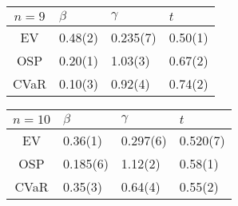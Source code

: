 \begin{tabular}{c||l|l|l}
    $n=9$          & $\beta$ & $\gamma$ & $t$     \\\hline\hline
    EV & 0.48(2) & 0.235(7) & 0.50(1) \\\hline
    OSP & 0.20(1) & 1.03(3) & 0.67(2) \\\hline
    CVaR & 0.10(3) & 0.92(4) & 0.74(2) \\\hline
\end{tabular}

\begin{tabular}{c||l|l|l}
    $n=10$          & $\beta$ & $\gamma$ & $t$     \\\hline\hline
    EV & 0.36(1) & 0.297(6) & 0.520(7) \\\hline
    OSP & 0.185(6) & 1.12(2) & 0.58(1) \\\hline
    CVaR & 0.35(3) & 0.64(4) & 0.55(2) \\\hline
\end{tabular}

